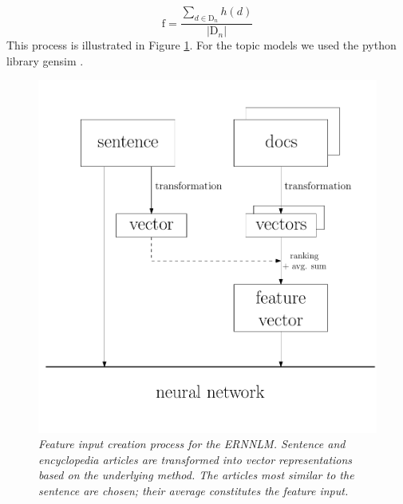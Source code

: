 \documentclass[a4paper]{article}
\begin{document}
\begin{equation}
\label{eq:f}
\text{f}=\dfrac{\sum_{d \in \text{D}_n} h(d)}{|\text{D}_n|}
\end{equation}
 This process is illustrated in Figure \ref{fig:flow}.
 For the topic models we used the python library gensim \cite{gensimTo21:online}.
\begin{figure} 
\centering 
\includegraphics[width=\columnwidth]{flow.pdf}
\caption{\it Feature input creation process for the ERNNLM. Sentence and encyclopedia articles are transformed into vector representations based on the underlying method. The articles most similar to the sentence are chosen; their average constitutes the feature input.}
\label{fig:flow}
\end{figure}
\end{document}
